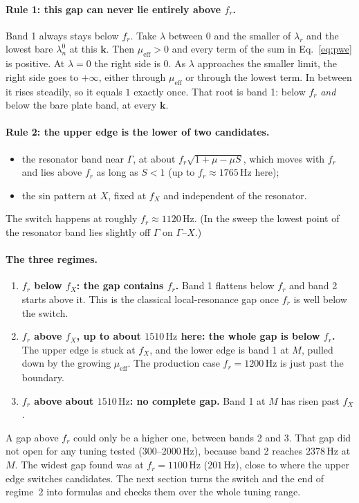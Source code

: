 \paragraph{Rule 1: this gap can never lie entirely above $f_r$.}
Band 1 always stays below $f_r$. Take $\lambda$ between $0$ and the smaller of
$\lambda_r$ and the lowest bare $\lambda_n^0$ at this $\mathbf{k}$. Then
$\mu_\mathrm{eff} > 0$ and every term of the sum in Eq.~\eqref{eq:pwe} is
positive. At $\lambda = 0$ the right side is $0$. As $\lambda$ approaches the
smaller limit, the right side goes to $+\infty$, either through
$\mu_\mathrm{eff}$ or through the lowest term. In between it rises steadily, so
it equals $1$ exactly once. That root is band 1: below $f_r$ \emph{and} below the
bare plate band, at every $\mathbf{k}$.

\paragraph{Rule 2: the upper edge is the lower of two candidates.}
\begin{itemize}
  \item the resonator band near $\Gamma$, at about
        $f_r\sqrt{1+\mu-\mu S}$, which moves with $f_r$ and lies above $f_r$ as
        long as $S < 1$ (up to $f_r \approx 1765\,\mathrm{Hz}$ here);
  \item the sin pattern at $X$, fixed at $f_X$ and independent of the resonator.
\end{itemize}
The switch happens at roughly $f_r \approx 1120\,\mathrm{Hz}$. (In the sweep the
lowest point of the resonator band lies slightly off $\Gamma$ on $\Gamma$--$X$.)

\paragraph{The three regimes.}
\begin{enumerate}
  \item \textbf{$f_r$ below $f_X$: the gap contains $f_r$.} Band 1 flattens below
        $f_r$ and band 2 starts above it. This is the classical local-resonance
        gap once $f_r$ is well below the switch.
  \item \textbf{$f_r$ above $f_X$, up to about $1510\,\mathrm{Hz}$ here: the
        whole gap is below $f_r$.} The upper edge is stuck at $f_X$, and the lower
        edge is band 1 at $M$, pulled down by the growing $\mu_\mathrm{eff}$. The
        production case $f_r = 1200\,\mathrm{Hz}$ is just past the boundary.
  \item \textbf{$f_r$ above about $1510\,\mathrm{Hz}$: no complete gap.} Band 1
        at $M$ has risen past $f_X$.
\end{enumerate}
A gap above $f_r$ could only be a higher one, between bands 2 and 3. That gap did
not open for any tuning tested ($300$--$2000\,\mathrm{Hz}$), because band 2
reaches $2378\,\mathrm{Hz}$ at $M$. The widest gap found was at
$f_r = 1100\,\mathrm{Hz}$ ($201\,\mathrm{Hz}$), close to where the upper edge
switches candidates. The next section turns the switch and the end of regime~2 into
formulas and checks them over the whole tuning range.


